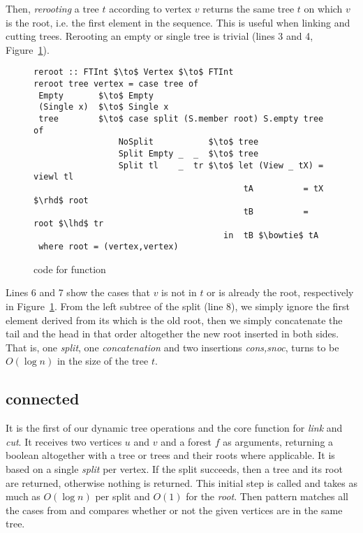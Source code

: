 Then, \textit{rerooting} a tree $t$ according to vertex $v$ returns the same tree $t$ on which $v$ is the root, i.e. the first element in the sequence. This is useful when linking and cutting trees. Rerooting an empty or single tree is trivial (lines 3 and 4, Figure~\ref{fig:reroot}). 
\begin{figure}
\begin{lstlisting}[mathescape]
reroot :: FTInt $\to$ Vertex $\to$ FTInt
reroot tree vertex = case tree of 
 Empty       $\to$ Empty 
 (Single x)  $\to$ Single x
 tree        $\to$ case split (S.member root) S.empty tree of 
                 NoSplit           $\to$ tree
                 Split Empty _  _  $\to$ tree 
                 Split tl    _  tr $\to$ let (View _ tX) = viewl tl 
                                          tA          = tX $\rhd$ root 
                                          tB          = root $\lhd$ tr 
                                      in  tB $\bowtie$ tA 
 where root = (vertex,vertex) 
\end{lstlisting} 
\caption{code for  function}
\label{fig:reroot}
\end{figure}
Lines 6 and 7 show the cases that $v$ is not in $t$ or is already the root, respectively in Figure~\ref{fig:reroot}. From the left subtree of the split (line 8), we simply ignore the first element derived from its  which is the old root, then we simply concatenate the tail and the head in that order altogether the new root inserted in both sides. That is, one \textit{split}, one \textit{concatenation} and two insertions \textit{cons,snoc}, turns to be $O(\log n)$ in the size of the tree $t$.  


\subsection{connected} 
It is the first of our dynamic tree operations and the core function for \textit{link} and \textit{cut}. It receives two vertices $u$ and $v$ and a forest $f$ as arguments, returning a boolean altogether with a tree or trees and their roots where applicable. It is based on a single \textit{split} per vertex. If the split succeeds, then a tree and its root are returned, otherwise nothing is returned. This initial step is called  and takes as much as $O(\log n)$ per split and $O(1)$ for the \textit{root}. Then  pattern matches all the cases from  and compares whether or not the given vertices are in the same tree. 

